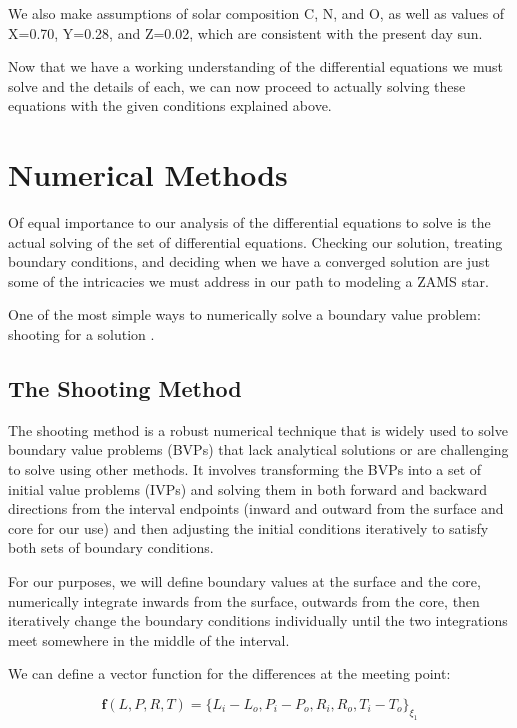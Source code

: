 \documentclass[twocolumn]{aastex631}
\begin{document}
We also make assumptions of solar composition C, N, and O, as well as values of X=0.70, Y=0.28, and Z=0.02, which are consistent with the present day sun. 

Now that we have a working understanding of the differential equations we must solve and the details of each, we can now proceed to actually solving these equations with the given conditions explained above.


\section{Numerical Methods}

Of equal importance to our analysis of the differential equations to solve is the actual solving of the set of differential equations. Checking our solution, treating boundary conditions, and deciding when we have a converged solution are just some of the intricacies we must address in our path to modeling a ZAMS star. 

One of the most simple ways to numerically solve a boundary value problem: shooting for a solution \citep{numrec}.

\subsection{The Shooting Method}

The shooting method is a robust numerical technique that is widely used to solve boundary value problems (BVPs) that lack analytical solutions or are challenging to solve using other methods.  It involves transforming the BVPs into a set of initial value problems (IVPs) and solving them in both forward and backward directions from the interval endpoints (inward and outward from the surface and core for our use) and then adjusting the initial conditions iteratively to satisfy both sets of boundary conditions. 

For our purposes, we will define boundary values at the surface and the core, numerically integrate inwards from the surface, outwards from the core, then iteratively change the boundary conditions individually until the two integrations meet somewhere in the middle of the interval. 

We can define a vector function for the differences at the meeting point:

\begin{equation}
	\label{eqn:diff}
	\textbf{f}(L, P, R, T) = \{ L_i - L_o, P_i - P_o, R_i, R_o, T_i - T_o \}_{\xi_1}
\end{equation}
\end{document}
